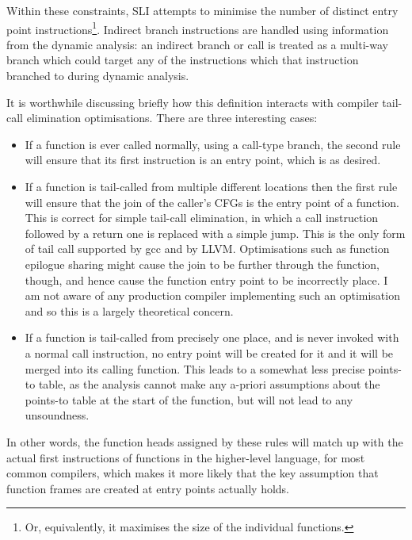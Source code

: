 Within these constraints, SLI attempts to minimise the number of
distinct entry point instructions\footnote{Or, equivalently, it
  maximises the size of the individual functions.}.  Indirect branch instructions are
handled using information from the dynamic analysis: an indirect
branch or call is treated as a multi-way branch which could target any
of the instructions which that instruction branched to during dynamic
analysis.

It is worthwhile discussing briefly how this definition interacts with
compiler tail-call elimination optimisations.  There are three
interesting cases:

\begin{itemize}
\item
  If a function is ever called normally, using a call-type branch, the
  second rule will ensure that its first instruction is an entry
  point, which is as desired.
\item
  If a function is tail-called from multiple different locations then
  the first rule will ensure that the join of the caller's CFGs is the
  entry point of a function.  This is correct for simple tail-call
  elimination, in which a call instruction followed by a return one is
  replaced with a simple jump.  This is the only form of tail call
  supported by gcc and by LLVM.  Optimisations such as function epilogue
  sharing\needCite{} might cause the join to be further through the
  function, though, and hence cause the function entry point to be
  incorrectly place.  I am not aware of any production compiler
  implementing such an optimisation and so this is a largely
  theoretical concern.
\item
  If a function is tail-called from precisely one place, and is never
  invoked with a normal call instruction, no entry point will be
  created for it and it will be merged into its calling function.
  This leads to a somewhat less precise points-to table, as the
  analysis cannot make any a-priori assumptions about the points-to
  table at the start of the function, but will not lead to any
  unsoundness.
\end{itemize}

In other words, the function heads assigned by these rules will match
up with the actual first instructions of functions in the higher-level
language, for most common compilers, which makes it more likely that
the key assumption that function frames are created at entry points
actually holds.

